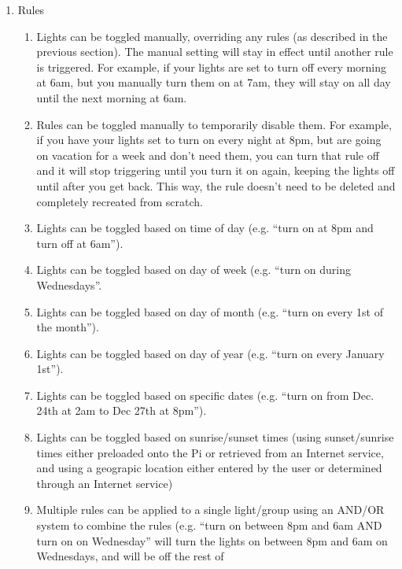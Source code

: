 \documentclass[12pt]{article}
\begin{document}
\begin{enumerate}
    \item Rules
        \begin{enumerate}
            \item Lights can be toggled manually, overriding any rules (as
                described in the previous section). The manual setting will
                stay in effect until another rule is triggered. For example, if
                your lights are set to turn off every morning at 6am, but you
                manually turn them on at 7am, they will stay on all day until
                the next morning at 6am.
            \item Rules can be toggled manually to temporarily disable them.
                For example, if you have your lights set to turn on every night
                at 8pm, but are going on vacation for a week and don't need
                them, you can turn that rule off and it will stop triggering
                until you turn it on again, keeping the lights off until after
                you get back. This way, the rule doesn't need to be deleted and
                completely recreated from scratch.
            \item Lights can be toggled based on time of day (e.g. ``turn on at
                8pm and turn off at 6am'').
            \item Lights can be toggled based on day of week (e.g. ``turn on
                during Wednesdays''.
            \item Lights can be toggled based on day of month (e.g. ``turn on
                every 1st of the month'').
            \item Lights can be toggled based on day of year (e.g. ``turn on
                every January 1st'').
            \item Lights can be toggled based on specific dates (e.g. ``turn on
                from Dec. 24th at 2am to Dec 27th at 8pm'').
            \item Lights can be toggled based on sunrise/sunset times (using
                sunset/sunrise times either preloaded onto the Pi or retrieved
                from an Internet service, and using a geograpic location either
                entered by the user or determined through an Internet service)
            \item Multiple rules can be applied to a single light/group using
                an AND/OR system to combine the rules (e.g. ``turn on between
                8pm and 6am AND turn on on Wednesday'' will turn the lights on
                between 8pm and 6am on Wednesdays, and will be off the rest of

\end{enumerate}
\end{enumerate}
\end{document}
